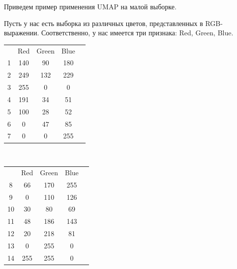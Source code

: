 \graphicspath{{chapters/colors/}}

Приведем пример применения UMAP на малой выборке.

Пусть у нас есть выборка из различных цветов, представленных в RGB-выражении. Соответственно, у нас имеется три признака: Red, Green, Blue.
\setlength{\extrarowheight}{2mm}
\begin{center}
\begin{multicols}{2}
	\begin{tabular}{c|c|c|cp{15mm}}
		& Red & Green & Blue & \\
		\cline{1-4}
		1 & 140 & 90 & 180 & \cellcolor[RGB]{140, 90, 180}\\
		\cline{1-4}
		2 & 249 & 132 & 229 & \cellcolor[RGB]{249, 132, 229}\\
		\cline{1-4}
		3 & 255 & 0 & 0 & \cellcolor[RGB]{255, 0, 0}\\
		\cline{1-4}
		4 & 191 & 34 & 51 & \cellcolor[RGB]{191, 34, 51}\\
		\cline{1-4}
		5 & 100 & 28 & 52 & \cellcolor[RGB]{100, 28, 52}\\
		\cline{1-4}
		6 & 0 & 47 & 85 & \cellcolor[RGB]{0, 47, 85}\\
		\cline{1-4}
		7 & 0 & 0 & 255 & \cellcolor[RGB]{0, 0, 255}\\
	\end{tabular}\\
	\begin{tabular}{c|c|c|cp{15mm}}
		& Red & Green & Blue & \\
		\cline{1-4}
		8 & 66 & 170 & 255 & \cellcolor[RGB]{66, 170, 255}\\
		\cline{1-4}
		9 & 0 & 110 & 126 & \cellcolor[RGB]{0, 110, 126}\\
		\cline{1-4}
		10 & 30 & 80 & 69 & \cellcolor[RGB]{30, 80, 69} \\
		\cline{1-4}
		11 & 48 & 186 & 143 & \cellcolor[RGB]{48, 186, 143}\\
		\cline{1-4}
		12 & 20 & 218 & 81 & \cellcolor[RGB]{20, 218, 81}\\
		\cline{1-4}
		13 & 0 & 255 & 0 & \cellcolor[RGB]{0, 255, 0}\\
		\cline{1-4}
		14 & 255 & 255 & 0 & \cellcolor[RGB]{255, 255, 0}\\
	\end{tabular}
\end{multicols}
\end{center}

